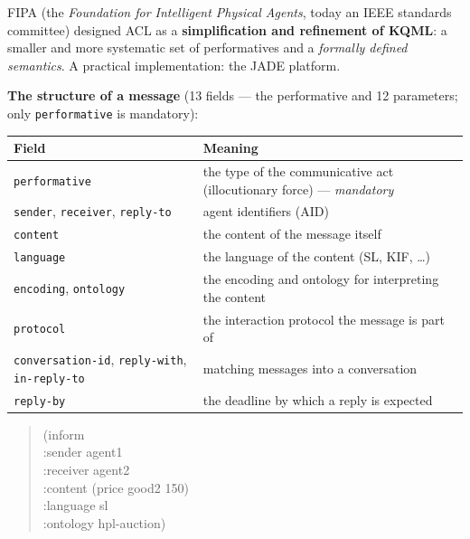\documentclass[11pt,a4paper]{article}
\theoremstyle{definition}
\begin{document}
\begin{defbox}
FIPA (the \emph{Foundation for Intelligent Physical Agents}, today an IEEE standards committee)
designed ACL as a \textbf{simplification and refinement of KQML}: a smaller and more systematic set of
performatives and a \emph{formally defined semantics}. A practical implementation: the JADE platform.

\textbf{The structure of a message} (13 fields --- the performative and 12 parameters; only
\texttt{performative} is mandatory):
\begin{center}\small
\begin{tabular}{@{}p{} p{}@{}}
\toprule
\textbf{Field} & \textbf{Meaning} \\
\midrule
\texttt{performative} & the type of the communicative act (illocutionary force) --- \emph{mandatory} \\
\texttt{sender}, \texttt{receiver}, \texttt{reply-to} & agent identifiers (AID) \\
\texttt{content} & the content of the message itself \\
\texttt{language} & the language of the content (SL, KIF, \dots) \\
\texttt{encoding}, \texttt{ontology} & the encoding and ontology for interpreting the content \\
\texttt{protocol} & the interaction protocol the message is part of \\
\texttt{conversation-id}, \texttt{reply-with}, \texttt{in-reply-to} & matching messages into a conversation \\
\texttt{reply-by} & the deadline by which a reply is expected \\
\bottomrule
\end{tabular}
\end{center}
\begin{quote}\small\ttfamily
(inform\\
\hspace*{1em}:sender agent1\\
\hspace*{1em}:receiver agent2\\
\hspace*{1em}:content (price good2 150)\\
\hspace*{1em}:language sl\\
\hspace*{1em}:ontology hpl-auction)
\end{quote}
\end{defbox}
\end{document}
